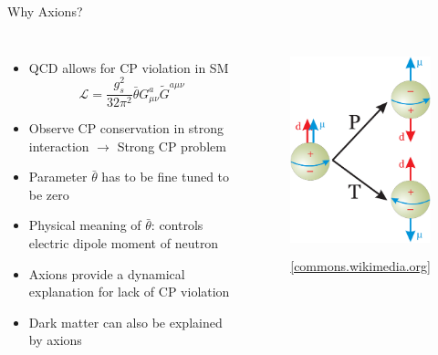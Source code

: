 \documentclass[aspectratio=1610, 9pt]{beamer}
\begin{document}
\begin{frame}{Why Axions?}
  \begin{columns}
    \begin{itemize}
      \item QCD allows for CP violation in SM\\
      \begin{equation*}
      	\mathcal{L} = \frac{g_s^2}{32 \pi^2} \bar{\theta} G^a_{\mu \nu} \tilde{G}^{a \mu \nu}
      \end{equation*}
      \item Observe CP conservation in strong interaction $\rightarrow$ Strong CP problem
      \item Parameter $\bar{\theta}$ has to be fine tuned to be zero
      \item Physical meaning of $\bar{\theta}$: controls electric dipole moment of neutron
      \item Axions provide a dynamical explanation for lack of CP violation
      \item Dark matter can also be explained by axions
    \end{itemize}
      \begin{figure}
      \includegraphics[height=6cm]{images/nEDM.png}
      \caption{\footnotesize \href{https://commons.wikimedia.org/wiki/File:NEDM_P26T_violation.png}{{[commons.wikimedia.org]}}}
      \end{figure}
  \end{columns} 
\end{frame}
\end{document}
